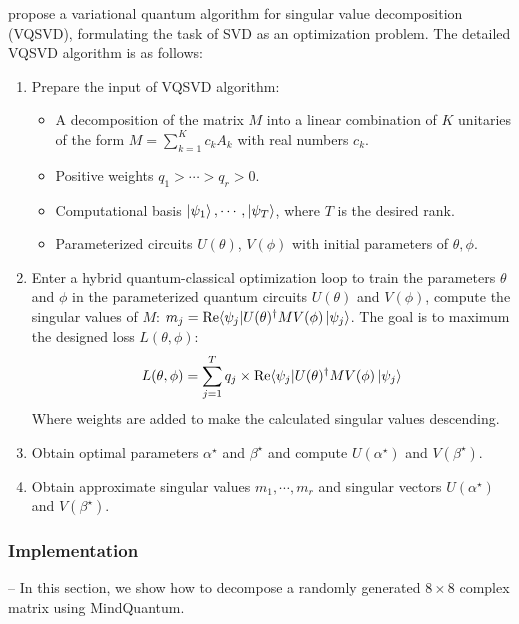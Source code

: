 \cite{wang2021variational} propose a variational quantum algorithm for singular value decomposition (VQSVD), formulating the task of SVD as an optimization problem. The detailed VQSVD algorithm is as follows:
\begin{enumerate}
    \item Prepare the input of VQSVD algorithm:
        \begin{itemize}
            \item A decomposition of the matrix $M$ into a linear combination of $K$ unitaries of the form $M = \sum_{k=1}^K c_k A_k$ with real numbers $c_k$.
            \item Positive weights $q_1 > \cdots > q_r > 0$.
            \item Computational basis {$\ket{\psi_1}, \cdots, \ket{\psi_T}$}, where $T$ is the desired rank.
            \item Parameterized circuits $U(\theta)$, $V(\phi)$ with initial parameters of $\theta, \phi$.
        \end{itemize}
    \item Enter a hybrid quantum-classical optimization loop to train the parameters $\theta$ and $\phi$ in the parameterized quantum circuits $U(\theta)$ and $V(\phi)$, compute the singular values of $M$: $m_j = \text{Re}\langle\psi_j|U(\theta)^{\dagger} M V(\phi)\ket{\psi_j}$. The goal is to maximum the designed loss $L(\theta, \phi)$:
    \begin{equation}
        L(\theta, \phi) = \sum_{j=1}^T q_j \times \text{Re} \langle\psi_j| U(\theta)^{\dagger} M V(\phi)\ket{\psi_j}
    \end{equation}
    Where weights are added to make the calculated singular values descending.
    \item Obtain optimal parameters $\alpha^ \star$ and $\beta^\star$ and compute $U(\alpha^\star)$ and $V(\beta^\star)$.
    \item Obtain approximate singular values ${m_1, \cdots, m_r}$ and  singular vectors $U(\alpha^\star)$ and $V(\beta^\star)$.
\end{enumerate}

\subsubsection{Implementation} -- In this section, we show how to decompose a randomly generated $8 \times 8$ complex matrix using MindQuantum.

